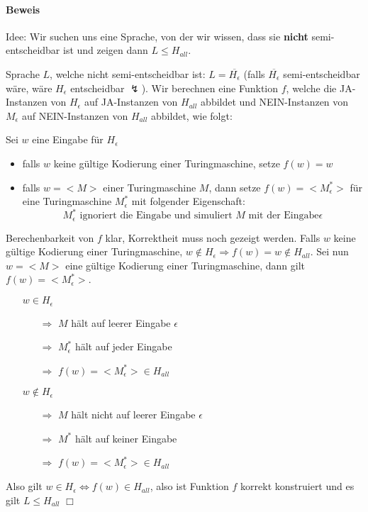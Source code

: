 \paragraph*{Beweis} Idee: Wir suchen uns eine Sprache, von der wir wissen, dass sie \textbf{nicht} semi-entscheidbar ist und zeigen dann $L \leq H_{all}$.

\par\medskip Sprache $L$, welche nicht semi-entscheidbar ist: $L=\overline{H_\epsilon}$ (falls $\overline{H_\epsilon}$ semi-entscheidbar wäre, wäre $H_\epsilon$ entscheidbar $\lightning$).
Wir berechnen eine Funktion $f$, welche die JA-Instanzen von $H_\epsilon$ auf JA-Instanzen von $H_{all}$ abbildet und NEIN-Instanzen von $M_\epsilon$ auf NEIN-Instanzen von $H_{all}$ abbildet, wie folgt:

\par\medskip Sei $w$ eine Eingabe für $H_\epsilon$
\begin{itemize}
	\item falls $w$ keine gültige Kodierung einer Turingmaschine, setze $f(w)=w$
	\item falls $w=<M>$ einer Turingmaschine $M$, dann setze $f(w)=<M_\epsilon^*>$ für eine Turingmaschine $M_\epsilon^*$ mit folgender Eigenschaft: $$ M_\epsilon^* \text{ ignoriert die Eingabe und simuliert } M \text{ mit der Eingabe} \epsilon $$
\end{itemize}
Berechenbarkeit von $f$ klar, Korrektheit muss noch gezeigt werden. Falls $w$ keine gültige Kodierung einer Turingmaschine, $w \not\in H_\epsilon \Rightarrow f(w)=w \not\in H_{all}$. Sei nun $w=<M>$ eine gültige Kodierung einer Turingmaschine, dann gilt $f(w)=<M_\epsilon^*>$.
\begin{itemize}
	\item[] $w \in H_\epsilon$
	\begin{itemize}
		\item[$\Rightarrow$] $M$ hält auf leerer Eingabe $\epsilon$
		\item[$\Rightarrow$] $M_\epsilon^*$ hält auf jeder Eingabe
		\item[$\Rightarrow$] $f(w)=<M_\epsilon^*> \in H_{all}$
	\end{itemize}
	\item[] $w \not\in H_\epsilon$
	\begin{itemize}
		\item[$\Rightarrow$] $M$ hält nicht auf leerer Eingabe $\epsilon$
		\item[$\Rightarrow$] $M^*$ hält auf keiner Eingabe
		\item[$\Rightarrow$] $f(w)=<M_\epsilon^*> \in H_{all}$
	\end{itemize}
\end{itemize}
Also gilt $w \in H_\epsilon \Leftrightarrow f(w) \in H_{all}$, also ist Funktion $f$ korrekt konstruiert und es gilt $L \leq H_{all}$ $\Box$